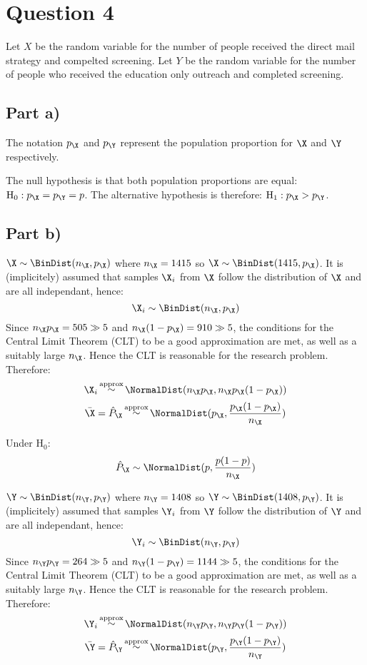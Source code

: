 \section{Question 4}

Let $X$ be the random variable for the number of people received the direct mail strategy and compelted screening.
Let $Y$ be the random variable for the number of people who received the education only outreach and completed screening.

\subsection{Part a)}

The notation $p_\X$ and $p_\Y$ represent the population proportion for $\X$ and $\Y$ respectively.

The null hypothesis is that both population proportions are equal: $\text{H}_0: p_\X = p_\Y = p$. The alternative hypothesis is therefore: $\text{H}_1 : p_\X > p_\Y$.

\subsection{Part b)}

$\X \sim \BinDist (n_\X, p_\X)$ where $n_\X = 1415$ so $\X \sim \BinDist (1415, p_\X)$.
It is (implicitely) assumed that samples $\X_i$ from $\X$ follow the distribution of $\X$ and are all independant, hence:
\[
\X_i \sim \BinDist(n_\X, p_\X)
\]
Since $n_\X p_\X = 505 \gg 5$ and $n_\X(1-p_\X)=910 \gg 5$, the conditions for the Central Limit Theorem (CLT) to be a good approximation are met, as well as a suitably large $n_\X$. Hence the CLT is reasonable for the research problem.
Therefore:
\[
\X_i \mathop \sim ^\text{approx} \NormalDist (n_\X p_\X, n_\X p_\X (1 - p_\X))
\]
\[
\bar{\X} = \hat{P}_\X \mathop \sim ^\text{approx} \NormalDist (p_\X, \frac{p_\X (1 - p_\X)}{n_\X})
\]

Under $\text{H}_0$:
\[
\hat{P}_\X \sim \NormalDist (p, \frac{p (1 - p)}{n_\X})
\]


$\Y \sim \BinDist (n_\Y, p_\Y)$ where $n_\Y = 1408$ so $\Y \sim \BinDist (1408, p_\Y)$.
It is (implicitely) assumed that samples $\Y_i$ from $\Y$ follow the distribution of $\Y$ and are all independant, hence:
\[
\Y_i \sim \BinDist(n_\Y, p_\Y)
\]
Since $n_\Y p_\Y = 264 \gg 5$ and $n_\Y(1-p_\Y)=1144 \gg 5$, the conditions for the Central Limit Theorem (CLT) to be a good approximation are met, as well as a suitably large $n_\Y$. Hence the CLT is reasonable for the research problem.
Therefore:
\[
\Y_i \mathop \sim ^\text{approx} \NormalDist (n_\Y p_\Y, n_\Y p_\Y (1 - p_\Y))
\]
\[
\bar{\Y} = \hat{P}_\Y \mathop \sim ^\text{approx} \NormalDist (p_\Y, \frac{p_\Y (1 - p_\Y)}{n_\Y})
\]

